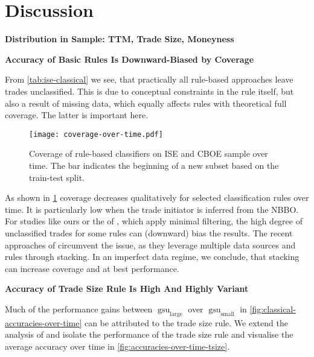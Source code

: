 \section{Discussion}\label{sec:discussion}

\textbf{Distribution in Sample: TTM, Trade Size, Moneyness}

\textbf{Accuracy of Basic Rules Is Downward-Biased by Coverage}

From \cref{tab:ise-classical} we see, that practically all rule-based approaches leave trades unclassified. This is due to conceptual constraints in the rule itself, but also a result of missing data, which equally affects rules with theoretical full coverage. The latter is important here.

\begin{figure}[!h]
    \centering
    \texttt{[image: coverage-over-time.pdf]}
    \caption[Coverage of Rule-Based Classifiers Over Time]{Coverage of rule-based classifiers on \gls{ISE} and \gls{CBOE} sample over time. The bar \myline{} indicates the beginning of a new subset based on the train-test split.}
    \label{fig:classical-coverage-over-time}
\end{figure}


As shown in \cref{fig:classical-coverage-over-time} coverage decreases qualitatively for selected classification rules over time. It is particularly low when the trade initiator is inferred from the \gls{NBBO}. For studies like ours or the of \textcites{grauerOptionTradeClassification2022}[][887]{savickasInferringDirectionOption2003}, which apply minimal filtering, the high degree of unclassified trades for some rules can (downward) bias the results. The recent approaches of \textcite[][18--19]{grauerOptionTradeClassification2022} circumvent the issue, as they leverage multiple data sources and rules through stacking. In an imperfect data regime, we conclude, that stacking can increase coverage and at best performance.

\textbf{Accuracy of Trade Size Rule Is High And Highly Variant}

Much of the performance gains between $\operatorname{gsu}_{\mathrm{large}}$ over $\operatorname{gsu}_{\mathrm{small}}$ in \cref{fig:classical-accuracies-over-time} can be attributed to the trade size rule. We extend the analysis of \textcite[][19]{grauerOptionTradeClassification2022} and isolate the performance of the trade size rule and visualise the average accuracy over time in \cref{fig:accuracies-over-time-tsize}.

